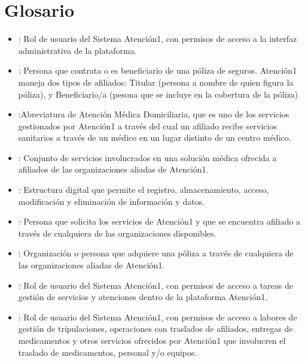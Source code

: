 \documentclass[letterpaper,10pt,spanish]{sphinxmanual}
\begin{document}
\chapter{Glosario}
\label{\detokenize{glosario:glosario}}\label{\detokenize{glosario::doc}}\begin{itemize}
\item {} 
: Rol de usuario del Sistema Atención\sphinxhyphen{}1, con permisos de acceso a la interfaz administrativa de la plataforma.

\item {} 
: Persona que contrata o es beneficiario de una póliza de seguros. Atención\sphinxhyphen{}1 maneja dos tipos de afiliados: Titular (persona a nombre de quien figura la póliza), y Beneficiario/a (pesona que se incluye en la cobertura de la póliza)

\item {} 
:Abreviatura de Atención Médica Domiciliaria, que es uno de los servicios gestionados por Atención\sphinxhyphen{}1 a través del cual un afiliado recibe servicios sanitarios a través de un médico en un lugar distinto de un centro médico.

\item {} 
: Conjunto de servicios involucrados en una solución médica ofrecida a afiliados de las organizaciones aliadas de Atención\sphinxhyphen{}1.

\item {} 
: Estructura digital que permite el registro, almacenamiento, acceso, modificación y eliminación de información y datos.

\item {} 
: Persona que solicita los servicios de Atención\sphinxhyphen{}1 y que se encuentra afiliado a través de cualquiera de las organizaciones disponibles.

\item {} 
: Organización o persona que adquiere una póliza a través de cualquiera de las organizaciones aliadas de Atención\sphinxhyphen{}1.

\item {} 
: Rol de usuario del Sistema Atención\sphinxhyphen{}1, con permisos de acceso a tareas de gestión de servicios y atenciones dentro de la plataforma Atención\sphinxhyphen{}1.

\item {} 
: Rol de usuario del Sistema Atención\sphinxhyphen{}1, con permisos de acceso a labores de gestión de tripulaciones, operaciones con traslados de afiliados, entregas de medicamentos y otros servicios ofrecidos por Atención\sphinxhyphen{}1 que involucren el traslado de medicamentos, personal y/o equipos.


\end{itemize}
\end{document}
